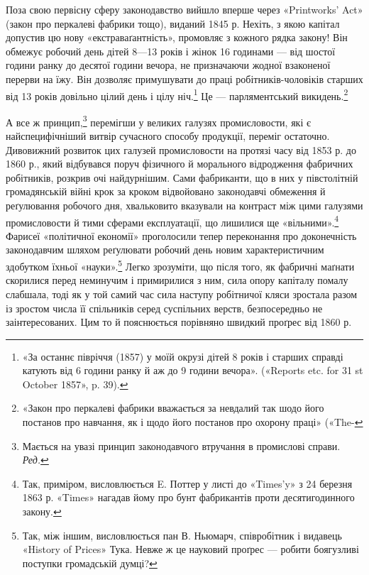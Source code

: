 Поза свою первісну сферу законодавство вийшло вперше через
«Printworks’ Act» (закон про перкалеві фабрики тощо), виданий
1845 р. Нехіть, з якою капітал допустив цю нову «екстраваґантність»,
промовляє з кожного рядка закону! Він обмежує
робочий день дітей 8—13 років і жінок 16 годинами — від шостої
години ранку до десятої години вечора, не призначаючи жодної
взаконеної перерви на їжу. Він дозволяє примушувати до праці
робітників-чоловіків старших від 13 років довільно цілий
день і цілу ніч.\footnote{
«За останнє півріччя (1857) у моїй окрузі дітей 8 років і старших
справді катують від 6 години ранку й аж до 9 години вечора». («Reports
etc. for 31 st October 1857», p. 39).
} Це — парляментський викидень.\footnote{
«Закон про перкалеві фабрики вважається за невдалий так шодо його
постанов про навчання, як і щодо його постанов про охорону праці» («The-
}

А все ж принцип,\footnote*{
Мається на увазі принцип законодавчого втручання в промислові
справи. \emph{Ред.}
} перемігши у великих галузях промисловости,
які є найспецифічніший витвір сучасного способу продукції,
переміг остаточно. Дивовижний розвиток цих галузей промисловости
на протязі часу від 1853 р. до 1860 р., який відбувався
поруч фізичного й морального відродження фабричних робітників,
розкрив очі найдурнішим. Сами фабриканти, що в них у
півстолітній громадянській війні крок за кроком відвойовано
законодавчі обмеження й реґулювання робочого дня, хвальковито
вказували на контраст між цими галузями промисловости
й тими сферами експлуатації, що лишилися ще «вільними».\footnote{
Так, приміром, висловлюється E. Поттер у листі до «Times’y»
з 24 березня 1863 р. «Times» нагадав йому про бунт фабрикантів проти
десятигодинного закону.
}
Фарисеї «політичної економії» проголосили тепер переконання
про доконечність законодавчим шляхом реґулювати робочий день
новим характеристичним здобутком їхньої «науки».\footnote{
Так, між іншим, висловлюється пан В. Ньюмарч, співробітник
і видавець «History of Prices» Тука. Невже ж це науковий проґрес —
робити боягузливі поступки громадській думці?
} Легко
зрозуміти, що після того, як фабричні маґнати скорилися перед
неминучим і примирилися з ним, сила опору капіталу помалу
слабшала, тоді як у той самий час сила наступу робітничої кляси
зростала разом із зростом числа її спільників серед суспільних
верств, безпосередньо не заінтересованих. Цим то й пояснюється
порівняно швидкий проґрес від 1860 р.

